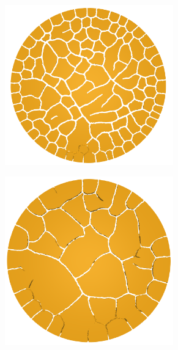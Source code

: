 \begin{frame}
\begin{columns}[T]
\begin{column}{0.6\textwidth}
\begin{figure}
        \begin{subfigure}{0.32\textwidth}
          \centering
          \includegraphics[width=0.8\textwidth]{Chapter345/figures/4mm_top.png}
        \end{subfigure}
        \begin{subfigure}{0.32\textwidth}
          \centering
          \includegraphics[width=0.8\textwidth]{Chapter345/figures/8mm_top.png}
        \end{subfigure}
        \begin{subfigure}{0.32\textwidth}
          \centering

\end{subfigure}
\end{figure}
\end{column}
\end{columns}
\end{frame}
